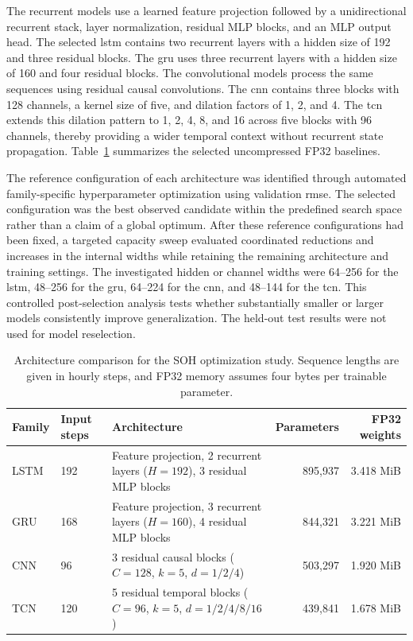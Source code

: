 \documentclass[final,3p,times]{elsarticle}
\begin{document}
The recurrent models use a learned feature projection followed by a unidirectional recurrent stack, layer normalization, residual MLP blocks, and an MLP output head. The selected \ac{lstm} contains two recurrent layers with a hidden size of 192 and three residual blocks. The \ac{gru} uses three recurrent layers with a hidden size of 160 and four residual blocks. The convolutional models process the same sequences using residual causal convolutions. The \ac{cnn} contains three blocks with 128 channels, a kernel size of five, and dilation factors of 1, 2, and 4. The \ac{tcn} extends this dilation pattern to 1, 2, 4, 8, and 16 across five blocks with 96 channels, thereby providing a wider temporal context without recurrent state propagation. Table~\ref{tab:arch_portfolio} summarizes the selected uncompressed FP32 baselines.

The reference configuration of each architecture was identified through automated family-specific hyperparameter optimization using validation \ac{rmse}. The selected configuration was the best observed candidate within the predefined search space rather than a claim of a global optimum. After these reference configurations had been fixed, a targeted capacity sweep evaluated coordinated reductions and increases in the internal widths while retaining the remaining architecture and training settings. The investigated hidden or channel widths were 64--256 for the \ac{lstm}, 48--256 for the \ac{gru}, 64--224 for the \ac{cnn}, and 48--144 for the \ac{tcn}. This controlled post-selection analysis tests whether substantially smaller or larger models consistently improve generalization. The held-out test results were not used for model reselection.

\begin{table}[t]
\centering
\caption{Architecture comparison for the SOH optimization study. Sequence lengths are given in hourly steps, and FP32 memory assumes four bytes per trainable parameter.}
\label{tab:arch_portfolio}
\small
\begin{tabular}{llp{7.0cm}rr}
\toprule
Family & Input steps & Architecture & Parameters & FP32 weights \\
\midrule
LSTM & 192 & Feature projection, 2 recurrent layers ($H=192$), 3 residual MLP blocks & 895,937 & 3.418 MiB \\
GRU  & 168 & Feature projection, 3 recurrent layers ($H=160$), 4 residual MLP blocks & 844,321 & 3.221 MiB \\
CNN  & 96  & 3 residual causal blocks ($C=128$, $k=5$, $d=1/2/4$) & 503,297 & 1.920 MiB \\
TCN  & 120 & 5 residual temporal blocks ($C=96$, $k=5$, $d=1/2/4/8/16$) & 439,841 & 1.678 MiB \\
\bottomrule
\end{tabular}
\end{table}
\end{document}
